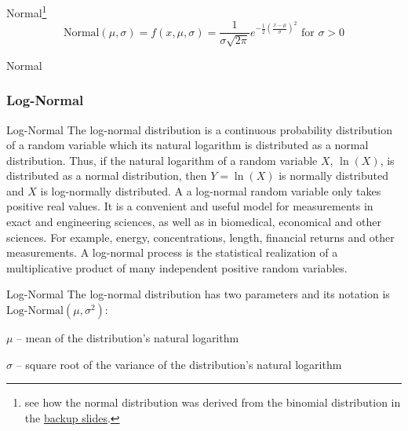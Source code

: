 \begin{frame}[noframenumbering]{Normal\footnote{
			see how the normal distribution was derived from the binomial
			distribution in the \hyperlink{appendixnormal}{backup slides}.}}
	$$\text{Normal}(\mu,\sigma) = f(x, \mu, \sigma) = \frac{1}{\sigma{\sqrt{2\pi }}}e^{-{\frac{1}{2}}\left({\frac {x-\mu }{\sigma }}\right)^{2}} \text{ for $\sigma > 0$}$$
\end{frame}

\begin{frame}[noframenumbering]{Normal}
	\centering
\end{frame}

\subsubsection*{Log-Normal}
\begin{frame}[noframenumbering]{Log-Normal}
	The log-normal distribution is a continuous probability distribution of a
	random variable which its natural logarithm is distributed as a normal distribution.
	Thus, if the natural logarithm of a random variable $X$, $\ln(X)$, is distributed
	as a normal distribution, then $Y = \ln(X)$ is normally distributed and
	$X$ is log-normally distributed.
	\vfill
	A a log-normal random variable only takes positive real values.
	It is a convenient and useful model for measurements in exact and engineering
	sciences, as well as in biomedical, economical and other sciences.
	For example, energy, concentrations, length, financial returns and other measurements.
	\vfill
	A log-normal process is the statistical realization of a multiplicative
	product of many independent positive random variables.
\end{frame}

\begin{frame}[noframenumbering]{Log-Normal}
	The log-normal distribution has two parameters and its notation is
	$\text{Log-Normal}(\mu, \sigma^2)$:
	\begin{vfilleditems}
		\item $\mu$ -- mean of the distribution's natural logarithm
		\item $\sigma$ -- square root of the variance of the distribution's natural logarithm
	\end{vfilleditems}
\end{frame}

